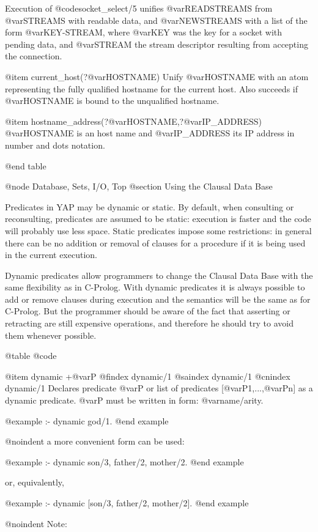 {{{{{{Execution of @code{socket_select/5} unifies @var{READSTREAMS} from
@var{STREAMS} with readable data, and @var{NEWSTREAMS} with a list of
the form @var{KEY-STREAM}, where @var{KEY} was the key for a socket
with pending data, and @var{STREAM} the stream descriptor resulting
from accepting the connection.  

@item current_host(?@var{HOSTNAME})
Unify @var{HOSTNAME} with an atom representing the fully qualified
hostname for the current host. Also succeeds if @var{HOSTNAME} is bound
to the unqualified hostname.

@item hostname_address(?@var{HOSTNAME},?@var{IP_ADDRESS})
@var{HOSTNAME} is an host name and @var{IP_ADDRESS} its IP
address in number and dots notation.


@end table

@node Database, Sets, I/O, Top
@section Using the Clausal Data Base

Predicates in YAP may be dynamic or static. By default, when
consulting or reconsulting, predicates are assumed to be static:
execution is faster and the code will probably use less space.
Static predicates impose some restrictions: in general there can be no 
addition or removal of  clauses for a procedure if it is being used in the
current execution.

Dynamic predicates allow programmers to change the Clausal Data Base with
the same flexibility as in C-Prolog. With dynamic predicates it is
always possible to add or remove clauses during execution and the
semantics will be the same as for C-Prolog. But the programmer should be
aware of the fact that asserting or retracting are still expensive operations, 
and therefore he should try to avoid them whenever possible.

@table @code

@item dynamic +@var{P}
@findex dynamic/1
@saindex dynamic/1
@cnindex dynamic/1
Declares predicate @var{P} or list of predicates [@var{P1},...,@var{Pn}]
as a dynamic predicate. @var{P} must be written in form:
@var{name/arity}.

@example
:- dynamic god/1.
@end example

@noindent 
a more convenient form can be used:

@example
:- dynamic son/3, father/2, mother/2.
@end example

or, equivalently,

@example
:- dynamic [son/3, father/2, mother/2].
@end example

@noindent
Note:

}}}}}}

